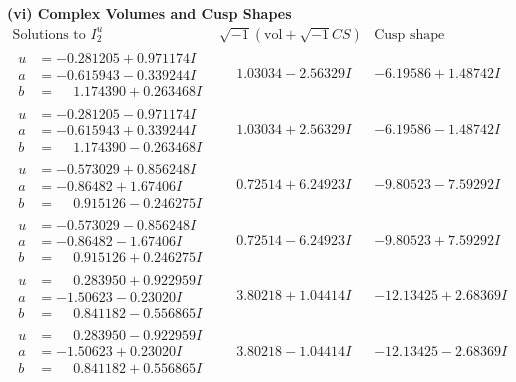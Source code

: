 \documentclass[1p]{elsarticle_modified}
\theoremstyle{definition}
\newcommand{\I}{\sqrt{-1}}
\begin{document}
\newpage\flushleft \textbf{(vi) Complex Volumes and Cusp Shapes}
$$\begin{array}{c|c|c}  
\text{Solutions to }I^u_{2}& \I (\text{vol} + \sqrt{-1}CS) & \text{Cusp shape}\\
 \hline 
\begin{aligned}
u &= -0.281205 + 0.971174 I \\
a &= -0.615943 - 0.339244 I \\
b &= \phantom{-}1.174390 + 0.263468 I\end{aligned}
 & \phantom{-}1.03034 - 2.56329 I & -6.19586 + 1.48742 I \\ \hline\begin{aligned}
u &= -0.281205 - 0.971174 I \\
a &= -0.615943 + 0.339244 I \\
b &= \phantom{-}1.174390 - 0.263468 I\end{aligned}
 & \phantom{-}1.03034 + 2.56329 I & -6.19586 - 1.48742 I \\ \hline\begin{aligned}
u &= -0.573029 + 0.856248 I \\
a &= -0.86482 + 1.67406 I \\
b &= \phantom{-}0.915126 - 0.246275 I\end{aligned}
 & \phantom{-}0.72514 + 6.24923 I & -9.80523 - 7.59292 I \\ \hline\begin{aligned}
u &= -0.573029 - 0.856248 I \\
a &= -0.86482 - 1.67406 I \\
b &= \phantom{-}0.915126 + 0.246275 I\end{aligned}
 & \phantom{-}0.72514 - 6.24923 I & -9.80523 + 7.59292 I \\ \hline\begin{aligned}
u &= \phantom{-}0.283950 + 0.922959 I \\
a &= -1.50623 - 0.23020 I \\
b &= \phantom{-}0.841182 - 0.556865 I\end{aligned}
 & \phantom{-}3.80218 + 1.04414 I & -12.13425 + 2.68369 I \\ \hline\begin{aligned}
u &= \phantom{-}0.283950 - 0.922959 I \\
a &= -1.50623 + 0.23020 I \\
b &= \phantom{-}0.841182 + 0.556865 I\end{aligned}
 & \phantom{-}3.80218 - 1.04414 I & -12.13425 - 2.68369 I \\ \hline\begin{aligned}

\end{aligned}
\end{array}$$
\end{document}
